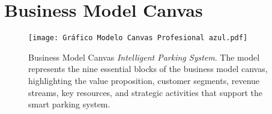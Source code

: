 \section{Business Model Canvas}




\begin{figure}[h!]
    \centering
   
    \texttt{[image: Gráfico Modelo Canvas Profesional azul.pdf]}
    \caption{Business Model Canvas \textit{Intelligent Parking System}. 
    The model represents the nine essential blocks of the business model canvas, highlighting the value proposition, customer segments, revenue streams, key resources, and strategic activities that support the smart parking system.}
    \label{fig:business_model_canvas}
\end{figure}


